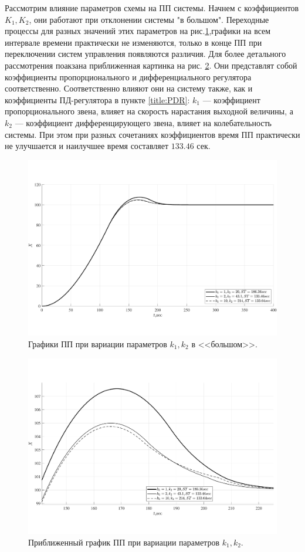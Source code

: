 Рассмотрим влияние параметров схемы на ПП системы.
Начнем с коэффициентов $K_1,K_2$, они работают при отклонении системы "в большом".
Переходные процессы для разных значений этих параметров на рис.\ref{fig:final_VSS_PWM_k2},графики на всем интервале времени практически не изменяются, только в конце ПП при переключении систем управления появляются различия. Для более детального рассмотрения поакзана приближенная картинка на рис. \ref{fig:final_VSS_PWM_k2_zoom}.
Они представлят собой коэффициенты пропорционального и дифференциального регулятора соответственно.
Соответственно влияют они на систему также, как и коэффициенты ПД-регулятора в пункте \ref{title:PDR}: $k_1$ --- коэффициент пропорционального звена, влияет на скорость нарастания выходной величины, а $k_2$ --- коэффициент дифференцирующего звена, влияет на колебательность системы.
При этом при разных сочетаниях коэффициентов время ПП практически не улучшается и наилучшее время составляет $133.46$ сек.
\begin{figure}[!h]\centering
	\includegraphics[width=1\linewidth]{images/final_VSS_PWM_k2}
	\caption{ Графики ПП при вариации параметров $k_1,k_2$ в <<большом>>.}\label{fig:final_VSS_PWM_k2}
\end{figure}
\begin{figure}[!h]\centering
	\includegraphics[width=1\linewidth]{images/final_VSS_PWM_k2_zoom}
	\caption{ Приближенный график ПП при вариации параметров $k_1,k_2$.}\label{fig:final_VSS_PWM_k2_zoom}
\end{figure}

